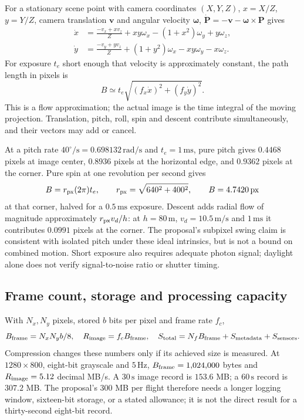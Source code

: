 For a stationary scene point with camera coordinates $(X,Y,Z)$,
$x=X/Z$, $y=Y/Z$, camera translation $\boldsymbol v$ and angular velocity
$\boldsymbol\omega$, $\dot{\boldsymbol P}=-\boldsymbol v-
\boldsymbol\omega\times\boldsymbol P$ gives
\begin{align}
 \dot x&=\frac{-v_x+xv_z}{Z}+xy\omega_x-(1+x^2)\omega_y+y\omega_z,\\
 \dot y&=\frac{-v_y+yv_z}{Z}+(1+y^2)\omega_x-xy\omega_y-x\omega_z.
\end{align}
For exposure $t_e$ short enough that velocity is approximately constant,
the path length in pixels is
\begin{equation}
 B\simeq t_e\sqrt{(f_x\dot x)^2+(f_y\dot y)^2}.
\end{equation}
This is a flow approximation; the actual image is the time integral of the
moving projection. Translation, pitch, roll, spin and descent contribute
simultaneously, and their vectors may add or cancel.

At a pitch rate $40^\circ/\mathrm s=0.698132\,\mathrm{rad/s}$ and
$t_e=1\,\mathrm{ms}$, pure pitch gives $0.4468$ pixels at image center,
$0.8936$ pixels at the horizontal edge, and $0.9362$ pixels at the corner.
Pure spin at one revolution per second gives
\begin{equation}
 B=r_{\rm px}(2\pi)t_e,
 \qquad r_{\rm px}=\sqrt{640^2+400^2},\qquad B=4.7420\,\mathrm{px}
\end{equation}
at that corner, halved for a $0.5\,\mathrm{ms}$ exposure.
Descent adds radial flow of magnitude approximately
$r_{\rm px}v_d/h$: at $h=80\,\mathrm m$, $v_d=10.5\,\mathrm{m/s}$
and $1\,\mathrm{ms}$ it contributes $0.0991$ pixels at the corner.
The proposal's subpixel swing claim is consistent with isolated pitch
under these ideal intrinsics, but is not a bound on combined motion.
Short exposure also requires adequate photon signal; daylight alone does
not verify signal-to-noise ratio or shutter timing.

\subsection{Frame count, storage and processing capacity}

With $N_x,N_y$ pixels, stored $b$ bits per pixel and frame rate $f_c$,
\begin{equation}
 B_{\rm frame}=N_xN_yb/8,
 \quad R_{\rm image}=f_cB_{\rm frame},
 \quad S_{\rm total}=N_fB_{\rm frame}+S_{\rm metadata}+S_{\rm sensors}.
\end{equation}
Compression changes these numbers only if its achieved size is measured.
At $1280\times800$, eight-bit grayscale and $5\,\mathrm{Hz}$,
$B_{\rm frame}=1{,}024{,}000$ bytes and $R_{\rm image}=5.12$ decimal
MB/s. A $30\,\mathrm s$ image record is $153.6$ MB; a $60\,\mathrm s$
record is $307.2$ MB. The proposal's $300$ MB per flight therefore
needs a longer logging window, sixteen-bit storage, or a stated allowance;
it is not the direct result for a thirty-second eight-bit record.

